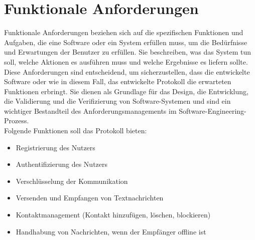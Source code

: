 \section{Funktionale Anforderungen}



Funktionale Anforderungen beziehen sich auf die spezifischen Funktionen und Aufgaben, 
die eine Software oder ein System erfüllen muss, um die Bedürfnisse und Erwartungen der Benutzer zu erfüllen.
Sie beschreiben, was das System tun soll, welche Aktionen es ausführen muss und welche 
Ergebnisse es liefern sollte. Diese Anforderungen sind entscheidend, um sicherzustellen, dass die entwickelte Software 
oder wie in diesem Fall, das entwickelte Protokoll die erwarteten Funktionen erbringt. Sie dienen 
als Grundlage für das Design, die Entwicklung, die Validierung und die Verifizierung von Software-Systemen und 
sind ein wichtiger Bestandteil des Anforderungsmanagements im Software-Engineering-Prozess.
\\

\noindent Folgende Funktionen soll das Protokoll bieten:

\begin{itemize}
    \item Registrierung des Nutzers
    \item Authentifizierung des Nutzers
    \item Verschlüsselung der Kommunikation
    \item Versenden und Empfangen von Textnachrichten
    \item Kontaktmanagement (Kontakt hinzufügen, löschen, blockieren)
    \item Handhabung von Nachrichten, wenn der Empfänger offline ist
\end{itemize}


%
%